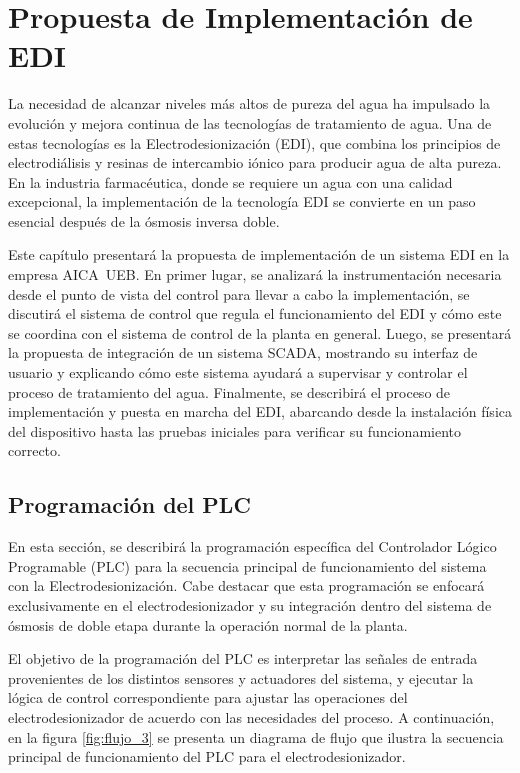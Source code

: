 \chapter{Propuesta de Implementación de EDI}
\label{cap:propuesta_implementacion}
La necesidad de alcanzar niveles más altos de pureza del agua ha impulsado
la evolución y mejora continua de las tecnologías de tratamiento de agua.
Una de estas tecnologías es la Electrodesionización (EDI), que combina
los principios de electrodiálisis y resinas de intercambio iónico para
producir agua de alta pureza. En la industria farmacéutica, donde se
requiere un agua con una calidad excepcional, la implementación de la
tecnología EDI se convierte en un paso esencial después de la ósmosis inversa doble.

Este capítulo presentará la propuesta de implementación de un sistema
EDI en la empresa AICA UEB. En primer lugar, se analizará la instrumentación
necesaria desde el punto de vista del control para llevar a cabo la implementación, se discutirá el sistema de
control que regula el funcionamiento del EDI y cómo este se coordina
con el sistema de control de la planta en general.
Luego, se presentará la propuesta de integración de un sistema SCADA,
mostrando su interfaz de usuario y explicando cómo este sistema
ayudará a supervisar y controlar el proceso de tratamiento del agua.
Finalmente, se describirá el proceso de implementación y puesta en marcha del
EDI, abarcando desde la instalación física del dispositivo hasta las pruebas
iniciales para verificar su funcionamiento correcto.




\section{Programación del PLC}
\label{sec:sistema_control}
En esta sección, se describirá la programación específica del Controlador
Lógico Programable (PLC) para la secuencia principal de funcionamiento del
sistema con la Electrodesionización. Cabe destacar que esta programación
se enfocará exclusivamente en el electrodesionizador y su integración dentro
del sistema de ósmosis de doble etapa durante la operación normal de la planta.

El objetivo de la programación del PLC es interpretar las señales de entrada
provenientes de los distintos sensores y actuadores del sistema, y ejecutar
la lógica de control correspondiente para ajustar las operaciones del
electrodesionizador de acuerdo con las necesidades del proceso.
A continuación, en la figura \ref{fig:flujo_3} se presenta un diagrama de flujo que ilustra la
secuencia principal de funcionamiento del PLC para el electrodesionizador.

